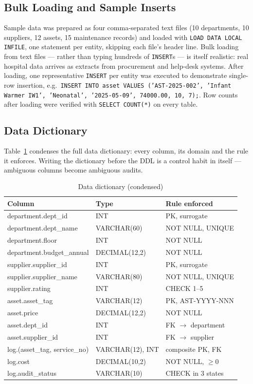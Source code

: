 \documentclass[conference]{IEEEtran}
\begin{document}
\subsection{Bulk Loading and Sample Inserts}\label{sec:bulk}
Sample data was prepared as four comma-separated text files (10 departments,
10 suppliers, 12 assets, 15 maintenance records) and loaded with
\texttt{LOAD DATA LOCAL INFILE}, one statement per entity, skipping each
file's header line. Bulk loading from text files --- rather than typing
hundreds of \texttt{INSERT}s --- is itself realistic: real hospital data
arrives as extracts from procurement and help-desk systems. After loading,
one representative \texttt{INSERT} per entity was executed to demonstrate
single-row insertion, e.g.\
\texttt{INSERT INTO asset VALUES ('AST-2025-002', 'Infant Warmer IW1',
'Neonatal', '2025-05-09', 74000.00, 10, 7);}. Row counts after loading were
verified with \texttt{SELECT COUNT(*)} on every table.

\subsection{Data Dictionary}
Table~\ref{tab:dict} condenses the full data dictionary: every column, its
domain and the rule it enforces. Writing the dictionary before the DDL is a
control habit in itself --- ambiguous columns become ambiguous audits.

\begin{table}[!t]
\caption{Data dictionary (condensed)}
\label{tab:dict}
\footnotesize
\begin{tabular}{p{2.9cm}p{1.9cm}p{2.7cm}}
\toprule
\textbf{Column} & \textbf{Type} & \textbf{Rule enforced} \\
\midrule
department.dept\_id & INT & PK, surrogate \\
department.dept\_name & VARCHAR(60) & NOT NULL, UNIQUE \\
department.floor & INT & NOT NULL \\
department.budget\_annual & DECIMAL(12,2) & NOT NULL \\
supplier.supplier\_id & INT & PK, surrogate \\
supplier.supplier\_name & VARCHAR(80) & NOT NULL, UNIQUE \\
supplier.rating & INT & CHECK 1--5 \\
asset.asset\_tag & VARCHAR(12) & PK, AST-YYYY-NNN \\
asset.price & DECIMAL(12,2) & NOT NULL \\
asset.dept\_id & INT & FK $\rightarrow$ department \\
asset.supplier\_id & INT & FK $\rightarrow$ supplier \\
log.(asset\_tag, service\_no) & VARCHAR(12), INT & composite PK, FK \\
log.cost & DECIMAL(10,2) & NOT NULL, $\geq 0$ \\
log.audit\_status & VARCHAR(10) & CHECK in 3 states \\
\bottomrule
\end{tabular}
\end{table}
\end{document}
